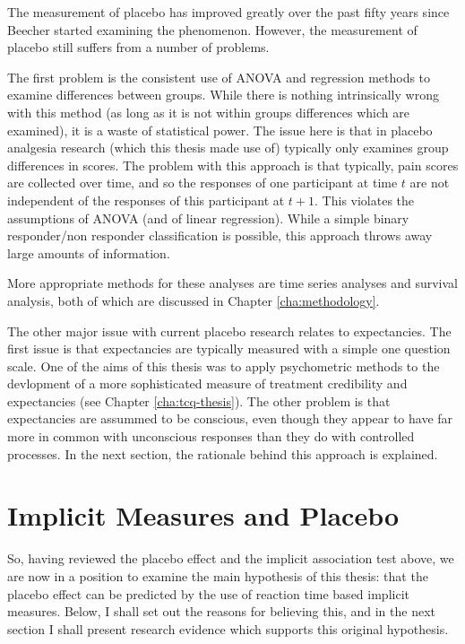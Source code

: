 The measurement of placebo has improved greatly over the past fifty years since Beecher started examining the phenomenon. However, the measurement of placebo still suffers from a number of problems.

The first problem is the consistent use of ANOVA and regression methods to examine differences between groups. While there is nothing intrinsically wrong with this method (as long as it is not within groups differences which are examined), it is a waste of statistical power. The issue here is that in placebo analgesia research (which this thesis made use of) typically only examines group differences in scores. The problem with this approach is that typically, pain scores are collected over time, and so the responses of one participant at time $t$ are not independent of the responses of this participant at $t+1$. This violates the assumptions of ANOVA (and of linear regression). While a simple binary responder/non responder classification is possible, this approach throws away large amounts of information.

More appropriate methods for these analyses are time series analyses and survival analysis, both of which are discussed in Chapter \ref{cha:methodology}. 

The other major issue with current placebo research relates to expectancies. The first issue is that expectancies are typically measured with a simple one question scale. One of the aims of this thesis was to apply psychometric methods to the devlopment of a more sophisticated measure of treatment credibility and expectancies (see Chapter \ref{cha:tcq-thesis}). The other problem is that expectancies are assummed to be conscious, even though they appear to have far more in common with unconscious responses than they do with controlled processes. In the next section, the rationale behind this approach is explained. 

\section{Implicit Measures and Placebo}
\label{sec:impl-meas-plac}
So, having reviewed the placebo effect and the implicit association test above, we are now in a position to examine the main hypothesis of this thesis: that the placebo effect can be predicted by the use of reaction time based implicit measures. Below, I shall set out the reasons for believing this, and in the next section I shall present research evidence which supports this original hypothesis. 

